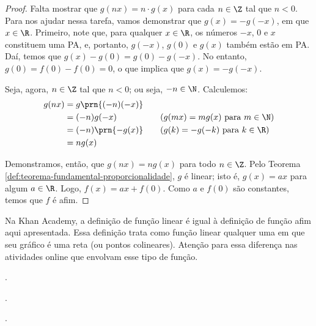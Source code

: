 \begin{proof}
	Falta mostrar que $g(nx) = n \cdot g(x)$ para cada $n \in \Z$ tal que $n < 0$.
	Para nos ajudar nessa tarefa, vamos demonstrar que $g(x) = -g(-x)$, em que $x \in \R$. 
	Primeiro, note que, para qualquer $x \in \R$, os números $-x$, $0$ e $x$
	constituem uma PA, e, portanto, $g(-x)$, $g(0)$ e $g(x)$ também estão em PA. Daí, temos que $g(x) - g(0) = 
	g(0)-g(-x)$. No entanto, $g(0) = f(0) - f(0) = 0$, o que implica que $g(x) = -g(-x)$.

	Seja, agora, $n \in \Z$ tal que $n < 0$; ou seja, $-n \in \N$. Calculemos:
	\begin{alignat*}{3}
		g(nx) &= g\prn{(-n)(-x)} &&  \\
		&= (-n)g(-x) && \quad\text{($g(mx) = mg(x)$ para $m\in\N$)} \\
		&= (-n)\prn{-g(x)} && \quad\text{($g(k) = -g(-k)$ para $k \in \R$)} \\
		&= ng(x)
	\end{alignat*}

	Demonstramos, então, que $g(nx) = ng(x)$ para todo $n \in \Z$. Pelo Teorema \ref{def:teorema-fundamental-proporcionalidade},
	$g$ é linear; isto é, $g(x) = ax$ para algum $a \in \R$. Logo, $f(x) = ax + f(0)$. Como $a$ e $f(0)$ são constantes,
	temos que $f$ é afim.

	
 \end{proof}

\begin{remark}
	Na Khan Academy, a definição de função linear é igual à definição de função afim aqui apresentada. Essa definição trata como função linear qualquer uma em que seu gráfico é uma reta (ou pontos colineares). Atenção para essa diferença nas atividades online que envolvam esse tipo de função.
\end{remark}

\begin{onlineact}
	.
\end{onlineact}

\begin{onlineact}
	.
\end{onlineact}

\begin{onlineact}
	.
\end{onlineact}